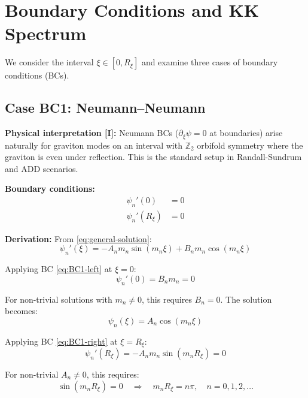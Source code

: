 \documentclass[11pt,a4paper]{article}
\newcommand{\Rxi}{R_\xi}
\begin{document}
\section{Boundary Conditions and KK Spectrum}

We consider the interval $\xi \in [0, \Rxi]$ and examine three cases of boundary
conditions (BCs).

\subsection{Case BC1: Neumann--Neumann}

\textbf{Physical interpretation [I]:} Neumann BCs ($\partial_\xi \psi = 0$ at boundaries)
arise naturally for graviton modes on an interval with $\mathbb{Z}_2$ orbifold
symmetry where the graviton is even under reflection. This is the standard setup
in Randall-Sundrum and ADD scenarios.

\textbf{Boundary conditions:}
\begin{align}
\psi_n'(0) &= 0 \label{eq:BC1-left}\\
\psi_n'(\Rxi) &= 0 \label{eq:BC1-right}
\end{align}

\textbf{Derivation:} From \eqref{eq:general-solution}:
\begin{equation}
\psi_n'(\xi) = -A_n m_n \sin(m_n \xi) + B_n m_n \cos(m_n \xi)
\label{eq:derivative-general}
\end{equation}

Applying BC \eqref{eq:BC1-left} at $\xi = 0$:
\begin{equation}
\psi_n'(0) = B_n m_n = 0
\label{eq:BC1-left-applied}
\end{equation}

For non-trivial solutions with $m_n \neq 0$, this requires $B_n = 0$. The solution
becomes:
\begin{equation}
\psi_n(\xi) = A_n \cos(m_n \xi)
\label{eq:BC1-solution-form}
\end{equation}

Applying BC \eqref{eq:BC1-right} at $\xi = \Rxi$:
\begin{equation}
\psi_n'(\Rxi) = -A_n m_n \sin(m_n \Rxi) = 0
\label{eq:BC1-right-applied}
\end{equation}

For non-trivial $A_n \neq 0$, this requires:
\begin{equation}
\sin(m_n \Rxi) = 0 \quad \Rightarrow \quad m_n \Rxi = n\pi, \quad n = 0, 1, 2, \ldots
\label{eq:BC1-quantization}
\end{equation}
\end{document}
